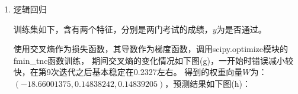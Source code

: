 \documentclass[UTF8,a4paper,12pt]{article}
\begin{document}
\begin{enumerate}[itemindent=0.5em,label=\arabic*、]
\begin{figure}[H]
  \end{figure}
  \item 逻辑回归
  \par 训练集如下，含有两个特征，分别是两门考试的成绩，$y$为是否通过。
  \begin{figure}[H]
  \centering
  \end{figure}
  使用交叉熵作为损失函数，其导数作为梯度函数，调用scipy.optimize模块的fmin\_tnc函数训练，
  期间交叉熵的变化情况如下图(g)，一开始时错误减小较快，在第9次迭代之后基本稳定在0.2327左右。
  得到的权重向量$W$为：$(-18.66001375,0.14838242,0.14839205)$，预测结果如下图(h)：
  \begin{figure}[H]
  \centering
  \end{figure}
\end{enumerate}
\end{document}
